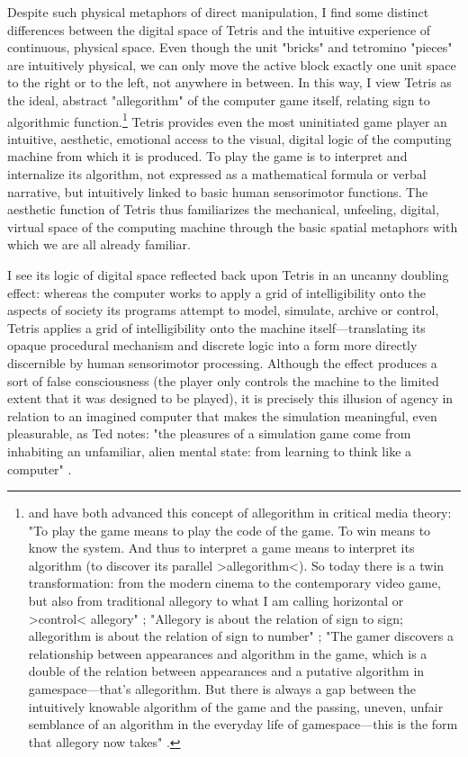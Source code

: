 Despite such physical metaphors of direct manipulation, I find some distinct differences between the digital space of Tetris and the intuitive experience of continuous, physical space. Even though the unit "bricks" and tetromino "pieces" are intuitively physical, we can only move the active block exactly one unit space to the right or to the left, not anywhere in between. In this way, I view Tetris as the ideal, abstract "allegorithm" of the computer game itself, relating sign to algorithmic function.\footnote{
  \citeauthor{Galloway2006-pp} and \citeauthor{Wark2007-ya} have both advanced this concept of allegorithm in critical media theory: "To play the game means to play the code of the game. To win means to know the system. And thus to interpret a game means to interpret its algorithm (to discover its parallel >allegorithm<). So today there is a twin transformation: from the modern cinema to the contemporary video game, but also from traditional allegory to what I am calling horizontal or >control< allegory" \autocite[90-1]{Galloway2006-pp}; "Allegory is about the relation of sign to sign; allegorithm is about the relation of sign to number" \autocite[par.~041]{Wark2007-ya}; "The gamer discovers a relationship between appearances and algorithm in the game, which is a double of the relation between appearances and a putative algorithm in gamespace---that's allegorithm. But there is always a gap between the intuitively knowable algorithm of the game and the passing, uneven, unfair semblance of an algorithm in the everyday life of gamespace---this is the form that allegory now takes" \autocite[par.~031]{Wark2007-ya}.
  }
Tetris provides even the most uninitiated game player an intuitive, aesthetic, emotional access to the visual, digital logic of the computing machine from which it is produced. To play the game is to interpret and internalize its algorithm, not expressed as a mathematical formula or verbal narrative, but intuitively linked to basic human sensorimotor functions. The aesthetic function of Tetris thus familiarizes the mechanical, unfeeling, digital, virtual space of the computing machine through the basic spatial metaphors with which we are all already familiar.

I see its logic of digital space reflected back upon Tetris in an uncanny doubling effect: whereas the computer works to apply a grid of intelligibility onto the aspects of society its programs attempt to model, simulate, archive or control, Tetris applies a grid of intelligibility onto the machine itself---translating its opaque procedural mechanism and discrete logic into a form more directly discernible by human sensorimotor processing. Although the effect produces a sort of false consciousness (the player only controls the machine to the limited extent that it was designed to be played), it is precisely this illusion of agency in relation to an imagined computer that makes the simulation meaningful, even pleasurable, as Ted \citeauthor{Friedman2005} notes: "the pleasures of a simulation game come from inhabiting an unfamiliar, alien mental state: from learning to think like a computer" \autocite*[136]{Friedman2005}.


